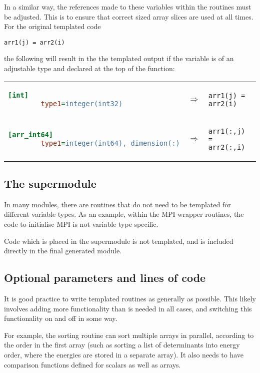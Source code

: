 \documentclass[a4paper,notitlepage]{scrreprt}
\begin{document}
{{	In a similar way, the references made to these variables within the
	routines must be adjusted. This is to ensure that correct sized array
	slices are used at all times. For the original templated code
	\begin{lstlisting}[gobble=4]
		arr1(j) = arr2(i)
	\end{lstlisting}
	the following will result in the the templated output if the variable is
	of an adjustable type and declared at the top of the function:

	\begin{tabular}{lcl}
	\begin{lstlisting}[language=ini,gobble=8]
		[int]
		type1=integer(int32)
	\end{lstlisting}
	& $\Longrightarrow$ &
	\begin{lstlisting}[gobble=8]
		arr1(j) = arr2(i)
	\end{lstlisting} \\[1.5em]

	\begin{lstlisting}[language=ini,gobble=8]
		[arr_int64]
		type1=integer(int64), dimension(:)
	\end{lstlisting}
	& $\Longrightarrow$ &
	\begin{lstlisting}[gobble=8]
		arr1(:,j) = arr2(:,i)
	\end{lstlisting}
	\end{tabular}

\subsection{The supermodule}
	In many modules, there are routines that do not need to be templated for
	different variable types. As an example, within the MPI wrapper routines,
	the code to initialise MPI is not variable type specific.

	Code which is placed in the supermodule is not templated, and is included
	directly in the final generated module.

\subsection{Optional parameters and lines of code}
	It is good practice to write templated routines as generally as possible.
	This likely involves adding more functionality than is needed in all cases,
	and switching this functionality on and off in some way.

	For example, the sorting routine can sort multiple arrays in parallel,
	according to the order in the first array (such as sorting a list of
	determinants into energy order, where the energies are stored in a separate
	array). It also needs to have comparison functions defined for scalars as
	well as arrays.

}}
\end{document}

